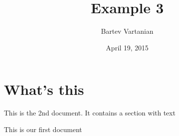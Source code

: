 \documentclass[a4paper, 11pt]{article}
\begin{document}
\title{Example 3}
\author{Bartev Vartanian}
\date{April 19, 2015}

\maketitle
\section{What's this}
This is the 2nd document.
It contains a section with text

This is our first document
\end{document}
